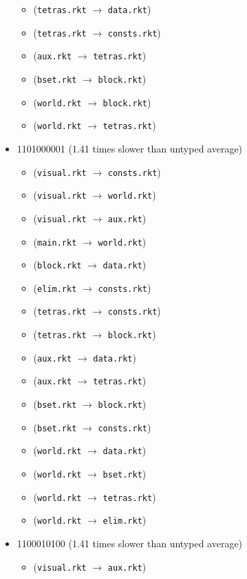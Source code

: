 \documentclass{article}
\newcommand{\mono}[1]{\texttt{#1}}
\begin{document}
\begin{itemize}
\begin{itemize}
  \item (\mono{tetras.rkt} $\rightarrow$ \mono{data.rkt})
  \item (\mono{tetras.rkt} $\rightarrow$ \mono{consts.rkt})
  \item (\mono{aux.rkt} $\rightarrow$ \mono{tetras.rkt})
  \item (\mono{bset.rkt} $\rightarrow$ \mono{block.rkt})
  \item (\mono{world.rkt} $\rightarrow$ \mono{block.rkt})
  \item (\mono{world.rkt} $\rightarrow$ \mono{tetras.rkt})
  \end{itemize}
\item 1101000001 (1.41 times slower than untyped average)
  \begin{itemize}
  \item (\mono{visual.rkt} $\rightarrow$ \mono{consts.rkt})
  \item (\mono{visual.rkt} $\rightarrow$ \mono{world.rkt})
  \item (\mono{visual.rkt} $\rightarrow$ \mono{aux.rkt})
  \item (\mono{main.rkt} $\rightarrow$ \mono{world.rkt})
  \item (\mono{block.rkt} $\rightarrow$ \mono{data.rkt})
  \item (\mono{elim.rkt} $\rightarrow$ \mono{consts.rkt})
  \item (\mono{tetras.rkt} $\rightarrow$ \mono{consts.rkt})
  \item (\mono{tetras.rkt} $\rightarrow$ \mono{block.rkt})
  \item (\mono{aux.rkt} $\rightarrow$ \mono{data.rkt})
  \item (\mono{aux.rkt} $\rightarrow$ \mono{tetras.rkt})
  \item (\mono{bset.rkt} $\rightarrow$ \mono{block.rkt})
  \item (\mono{bset.rkt} $\rightarrow$ \mono{consts.rkt})
  \item (\mono{world.rkt} $\rightarrow$ \mono{data.rkt})
  \item (\mono{world.rkt} $\rightarrow$ \mono{bset.rkt})
  \item (\mono{world.rkt} $\rightarrow$ \mono{tetras.rkt})
  \item (\mono{world.rkt} $\rightarrow$ \mono{elim.rkt})
  \end{itemize}
\item 1100010100 (1.41 times slower than untyped average)
  \begin{itemize}
  \item (\mono{visual.rkt} $\rightarrow$ \mono{aux.rkt})

\end{itemize}
\end{itemize}
\end{document}
